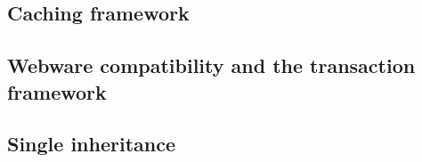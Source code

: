 \subsection{Caching framework}
\label{design.cache}



\subsection{Webware compatibility and the transaction framework}
\label{design.webware}

\subsection{Single inheritance}
\label{design.singleInheritance}





